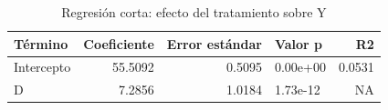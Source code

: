 
\begin{longtable}[t]{lrrlr}
\caption{Regresión corta: efecto del tratamiento sobre Y}\\
\toprule
Término & Coeficiente & Error estándar & Valor p & R2\\
\midrule
Intercepto & 55.5092 & 0.5095 & 0.00e+00 & 0.0531\\
D & 7.2856 & 1.0184 & 1.73e-12 & NA\\
\bottomrule
\end{longtable}
